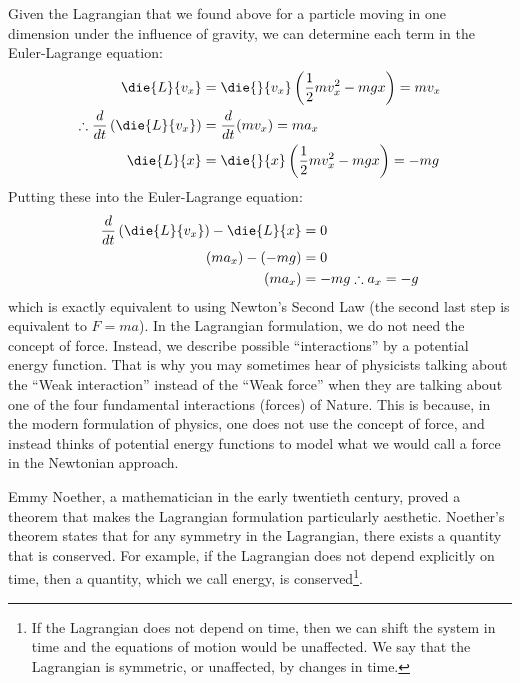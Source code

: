 Given the Lagrangian that we found above for a particle moving in one dimension under the influence of gravity, we can determine each term in the Euler-Lagrange equation:
\begin{align*}
\die{L}{v_x} &= \die{}{v_x}\left(\frac{1}{2}mv_x^2 - mgx \right)=mv_x\\
\therefore\frac{d}{dt}\left(\die{L}{v_x}\right) &= \frac{d}{dt} (mv_x) = ma_x\\
\die{L}{x}&= \die{}{x}\left(\frac{1}{2}mv_x^2 - mgx\right) = -mg\\
\end{align*}
Putting these into the Euler-Lagrange equation:
\begin{align*}
\frac{d}{dt}\left(\die{L}{v_x}\right)-\die{L}{x} &= 0\\
(ma_x) - (-mg) &=0\\
(ma_x)&=-mg
\therefore a_x = -g
\end{align*}
which is exactly equivalent to using Newton's Second Law (the second last step is equivalent to $F=ma$). In the Lagrangian formulation, we do not need the concept of force. Instead, we describe possible ``interactions'' by a potential energy function. That is why you may sometimes hear of physicists talking about the ``Weak interaction'' instead of the ``Weak force'' when they are talking about one of the four fundamental interactions (forces) of Nature. This is because, in the modern formulation of physics, one does not use the concept of force, and instead thinks of potential energy functions to model what we would call a force in the Newtonian approach.

Emmy Noether, a mathematician in the early twentieth century, proved a theorem that makes the Lagrangian formulation particularly aesthetic.
 Noether's theorem states that for any symmetry in the Lagrangian, there exists a quantity that is conserved. For example, if the Lagrangian does not depend explicitly on time, then a quantity, which we call energy, is conserved\footnote{If the Lagrangian does not depend on time, then we can shift the system in time and the equations of motion would be unaffected. We say that the Lagrangian is symmetric, or unaffected, by changes in time.}. 

